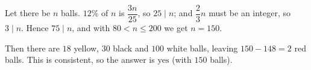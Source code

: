 Let there be $n$ balls. $12\%$ of $n$ is $\dfrac{3n}{25}$, so $25\mid n$; and $\dfrac23n$ must be an integer, so $3\mid n$. Hence $75\mid n$, and with $80<n\le200$ we get $n=150$.

Then there are $18$ yellow, $30$ black and $100$ white balls, leaving $150-148=2$ red balls. This is consistent, so the answer is $\boxed{\text{yes}}$ (with $150$ balls).
